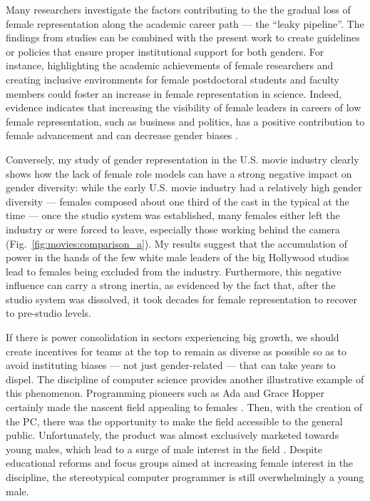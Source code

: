 Many researchers investigate the factors contributing to the the gradual loss of female representation along the academic career path --- the ``leaky pipeline''. The findings from studies can be combined with the present work to create guidelines or policies that ensure proper institutional support for both genders. For instance, highlighting the academic achievements of female researchers and creating inclusive environments for female postdoctoral students and faculty members could foster an increase in female representation in science. Indeed, evidence indicates that increasing the visibility of female leaders in careers of low female representation, such as business and politics, has a positive contribution to female advancement and can decrease gender biases \cite{Dean2008,Jalalzai2013,Zaichkowsky2014}.

Conversely, my study of gender representation in the U.S. movie industry clearly shows how the lack of female role models can have a strong negative impact on gender diversity: while the early U.S. movie industry had a relatively high gender diversity --- females composed about one third of the cast in the typical at the time --- once the studio system was established, many females either left the industry or were forced to leave, especially those working behind the camera (Fig.~\ref{fig:movies:comparison_a}). My results suggest that the accumulation of power in the hands of the few white male leaders of the big Hollywood studios lead to females being excluded from the industry. Furthermore, this negative influence can carry a strong inertia, as evidenced by the fact that, after the studio system was dissolved, it took decades for female representation to recover to pre-studio levels.

If there is power consolidation in sectors experiencing big growth, we should create incentives for teams at the top to remain as diverse as possible so as to avoid instituting biases --- not just gender-related --- that can take years to dispel. The discipline of computer science provides another illustrative example of this phenomenon. Programming pioneers such as Ada and Grace Hopper certainly made the nascent field appealing to females \cite{Sydell2014}. Then, with the creation of the PC, there was the opportunity to make the field accessible to the general public. Unfortunately, the product was almost exclusively marketed towards young males, which lead to a surge of male interest in the field \cite{Margolis2003}. Despite educational reforms and focus groups aimed at increasing female interest in the discipline, the stereotypical computer programmer is still overwhelmingly a young male.

